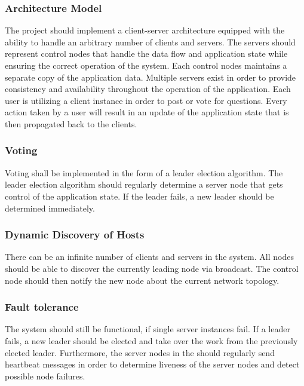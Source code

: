 \documentclass[runningheads]{llncs}
\begin{document}
\subsubsection{Architecture Model}

The project should implement a client-server\cite{berson1996client} architecture equipped
with the ability to handle an arbitrary number of clients and servers. The
servers should represent control nodes that handle the data flow and application
state while ensuring the correct operation of the system. Each control nodes
maintains a separate copy of the application data. Multiple servers exist in
order to provide consistency and availability throughout the operation of the
application. Each user is utilizing a client instance in order to post or vote
for questions. Every action taken by a user will result in an update of the
application state that is then propagated back to the clients.

\subsubsection{Voting}

Voting shall be implemented in the form of a leader election algorithm. The leader
election algorithm should regularly determine a server node that gets control
of the application state. If the leader fails, a new leader should be determined
immediately. 

\subsubsection{Dynamic Discovery of Hosts}

There can be an infinite number of clients and servers in the system. All nodes should
be able to discover the currently leading node via broadcast. The control node should then
notify the new node about the current network topology.

\subsubsection{Fault tolerance}

The system should still be functional, if single server instances fail. If a leader
fails, a new leader should be elected and take over the work from the previously
elected leader. Furthermore, the server nodes in the should regularly send heartbeat messages in order
to determine liveness of the server nodes and detect possible node failures.
\end{document}
